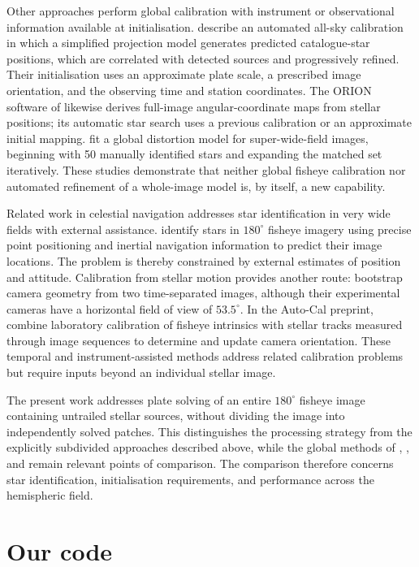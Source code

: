 \documentclass[12pt,a4paper]{article}
\begin{document}
Other approaches perform global calibration with instrument or observational
information available at initialisation. \citet{Barghini2019} describe an
automated all-sky calibration in which a simplified projection model generates
predicted catalogue-star positions, which are correlated with detected sources
and progressively refined. Their initialisation uses an approximate plate
scale, a prescribed image orientation, and the observing time and station
coordinates. The ORION software of \citet{AntunaSanchez2022}
likewise derives full-image angular-coordinate maps from stellar positions;
its automatic star search uses a previous calibration or an approximate initial
mapping. \citet{Yang2025} fit a global distortion model for super-wide-field
images, beginning with 50 manually identified stars and expanding the matched
set iteratively. These studies demonstrate that neither global fisheye
calibration nor automated refinement of a whole-image model is, by itself,
a new capability.

Related work in celestial navigation addresses star identification in very
wide fields with external assistance. \citet{Li2022} identify stars in
$180^\circ$ fisheye imagery using precise point positioning and inertial
navigation information to predict their image locations. The problem is thereby
constrained by external estimates of position and attitude. Calibration from
stellar motion provides another route: \citet{TeagueChahl2024} bootstrap camera
geometry from two time-separated images, although their experimental cameras
have a horizontal field of view of $53.5^\circ$. In the Auto-Cal preprint,
\citet{Kapali2025} combine laboratory calibration of fisheye intrinsics with
stellar tracks measured through image sequences to determine and update camera
orientation. These temporal and instrument-assisted methods address related
calibration problems but require inputs beyond an individual stellar image.

The present work addresses plate solving of an entire $180^\circ$ fisheye image
containing untrailed stellar sources, without dividing the image into
independently solved patches. This distinguishes the processing strategy from
the explicitly subdivided approaches described above, while the global methods
of \citet{Barghini2019}, \citet{AntunaSanchez2022}, and \citet{Yang2025} remain
relevant points of comparison. The comparison therefore concerns star identification, initialisation
requirements, and performance across the hemispheric field.

\section{Our code}
\end{document}
